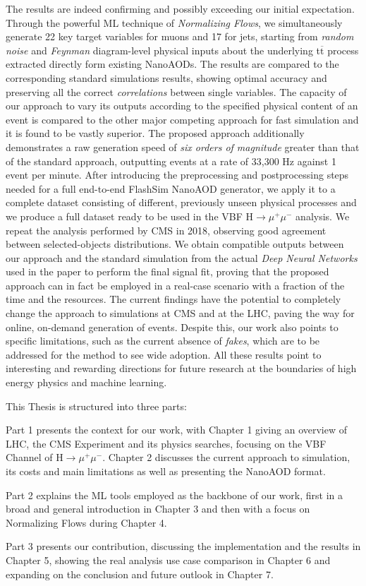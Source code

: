The results are indeed confirming and possibly exceeding our initial expectation. Through the powerful ML technique of \emph{Normalizing Flows}, we simultaneously generate 22 key target variables for muons and 17 for jets, starting from \emph{random noise} and \emph{Feynman} diagram-level physical inputs about the underlying t$\overline{\text{t}}$ process extracted directly form existing NanoAODs. The results are compared to the corresponding standard simulations results, showing optimal accuracy and preserving all the correct \emph{correlations} between single variables. 
The capacity of our approach to vary its outputs according to the specified physical content of an event is compared to the other major competing approach for fast simulation and it is found to be vastly superior. The proposed approach additionally demonstrates a raw generation speed of \emph{six orders of magnitude} greater than that of the standard approach, outputting events at a rate of 33,300 Hz against 1 event per minute. After introducing the preprocessing and postprocessing steps needed for a full end-to-end FlashSim NanoAOD generator, we apply it to a complete dataset consisting of different, previously unseen physical processes and we produce a full dataset ready to be used in the VBF H$\rightarrow\mu^+\mu^-$ analysis. We repeat the analysis performed by CMS in 2018, observing good agreement between selected-objects distributions. We obtain compatible outputs between our approach and the standard simulation from the actual \emph{Deep Neural Networks} used in the paper to perform the final signal fit, proving that the proposed approach can in fact be employed in a real-case scenario with a fraction of the time and the resources.
The current findings have the potential to completely change the approach to simulations at CMS and at the LHC, paving the way for online, on-demand generation of events. Despite this, our work also points to specific limitations, such as the current absence of \emph{fakes}, which are to be addressed for the method to see wide adoption. All these results point to interesting and rewarding directions for future research at the boundaries of high energy physics and machine learning.

This Thesis is structured into three parts:

Part 1 presents the context for our work, with Chapter 1 giving an overview of LHC, the CMS Experiment and its physics searches, focusing on the VBF Channel of H$\rightarrow\mu^+\mu^-$. Chapter 2 discusses the current approach to simulation, its costs and main limitations as well as presenting the NanoAOD format.

Part 2 explains the ML tools employed as the backbone of our work, first in a broad and general introduction in Chapter 3 and then with a focus on Normalizing Flows during Chapter 4.

Part 3 presents our contribution, discussing the implementation and the results in Chapter 5, showing the real analysis use case comparison in Chapter 6 and expanding on the conclusion and future outlook in Chapter 7. 
\endgroup

\vfill

